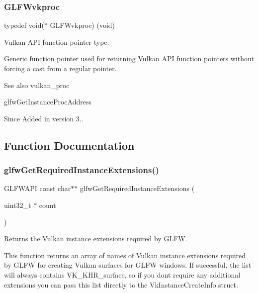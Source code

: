 \subsubsection{\texorpdfstring{G\+L\+F\+Wvkproc}{GLFWvkproc}}
{\footnotesize\ttfamily typedef void($\ast$ G\+L\+F\+Wvkproc) (void)}



Vulkan A\+PI function pointer type. 

Generic function pointer used for returning Vulkan A\+PI function pointers without forcing a cast from a regular pointer.

\begin{DoxySeeAlso}{See also}
vulkan\+\_\+proc 

glfw\+Get\+Instance\+Proc\+Address
\end{DoxySeeAlso}
\begin{DoxySince}{Since}
Added in version 3.. 
\end{DoxySince}


\subsection{Function Documentation}
\mbox{\label{group__vulkan_ga70adaf0cfc99adc484c49ea99e17c2cf}} 
\subsubsection{\texorpdfstring{glfw\+Get\+Required\+Instance\+Extensions()}{glfwGetRequiredInstanceExtensions()}}
{\footnotesize\ttfamily G\+L\+F\+W\+A\+PI const char$\ast$$\ast$ glfw\+Get\+Required\+Instance\+Extensions (\begin{DoxyParamCaption}\item[{uint32\+\_\+t $\ast$}]{count }\end{DoxyParamCaption})}



Returns the Vulkan instance extensions required by G\+L\+FW. 

This function returns an array of names of Vulkan instance extensions required by G\+L\+FW for creating Vulkan surfaces for G\+L\+FW windows. If successful, the list will always contains {\ttfamily V\+K\+\_\+\+K\+H\+R\+\_\+surface}, so if you don\textquotesingle{}t require any additional extensions you can pass this list directly to the {\ttfamily Vk\+Instance\+Create\+Info} struct.

